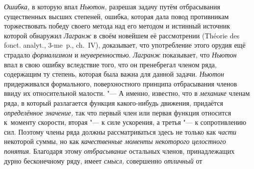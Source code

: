 {\em Ошибка,} в которую впал {\em Ньютон,} разрешая задачу путём отбрасывания
существенных высших степеней, ошибка, которая дала повод противникам
торжествовать победу своего метода над его методом и истинный источник которой
обнаружил {\em Лагранж} в своём новейшем её рассмотрении (Théorie des fonct.
analyt., 3-me~p., ch.~IV), доказывает, что употребление этого орудия ещё
страдало {\em формализмом} и {\em неуверенностью}. {\em Лагранж} показывает,
что {\em Ньютон} впал в свою ошибку вследствие того, что он пренебрегал членом
ряда, содержащим ту степень, которая была важна для данной задачи. {\em Ньютон}
придерживался формального, поверхностного принципа отбрасывания членов ввиду их
относительной малости. "--- А именно, известно, что в {\em механике} членам
ряда, в который разлагается функция какого-нибудь движения, придаётся
{\em определённое значение,} так что первый член или первая функция относится
к~моменту скорости, вторая "--- к силе ускорения, а третья "--- к сопротивлению
сил. Поэтому члены ряда должны рассматриваться здесь не только как {\em части}
некоторой суммы, но как {\em качественные моменты некоторого целостного
понятия}. Благодаря этому {\em отбрасывание} остальных членов, принадлежащих
дурно бесконечному ряду, имеет {\em смысл,} совершенно {\em отличный} от
